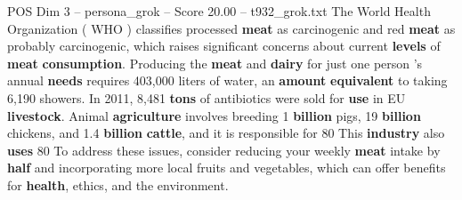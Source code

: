 \begin{textsample}{POS Dim 3 – persona\_grok – Score 20.00 – t932\_grok.txt}  \label{ex:f3_pos_031}
The World Health Organization ( WHO ) classifies processed \textbf{meat} as carcinogenic and red \textbf{meat} as probably carcinogenic, which raises significant concerns about current \textbf{levels} of \textbf{meat} \textbf{consumption}.
Producing the \textbf{meat} and \textbf{dairy} for just one person 's annual \textbf{needs} requires 403,000 liters of water, an \textbf{amount} \textbf{equivalent} to taking 6,190 showers.
In 2011, 8,481 \textbf{tons} of antibiotics were sold for \textbf{use} in EU \textbf{livestock}.
Animal \textbf{agriculture} involves breeding 1 \textbf{billion} pigs, 19 \textbf{billion} chickens, and 1.4 \textbf{billion} \textbf{cattle}, and it is responsible for 80 %
This \textbf{industry} also \textbf{uses} 80 %
To address these issues, consider reducing your weekly \textbf{meat} intake by \textbf{half} and incorporating more local fruits and vegetables, which can offer benefits for \textbf{health}, ethics, and the environment.

\end{textsample}
